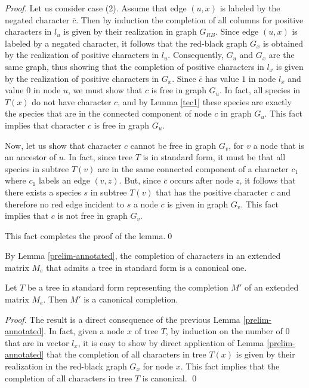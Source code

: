 \documentclass{llncs}
\begin{document}
\begin{proof}
 
 
 
 
Let us consider case (2).
Assume that edge $(u,x)$ is labeled by the negated character $\bar{c}$. Then by induction the completion of all columns for positive characters in $l_u$ is given by their realization in graph $G_{RB}$. Since edge $(u,x)$ is labeled by a negated character, it follows that the red-black graph $G_x$ is obtained by the realization of  positive characters in $l_u$.  Consequently, $G_u$ and $G_x$ are the same graph, thus showing that the completion of  positive characters in $l_x$ is   given by the realization of positive characters in $G_x$. Since $\bar{c}$ has value $1$ in node $l_x$ and value $0$ in node $u$, we must show that  $c$ is  free in graph $G_u$. In fact,  all species in $T(x)$ do not have character $c$, and by Lemma \ref{tec1} these species  are exactly the species that are  in the connected component of node $c$ in graph $G_u$. This fact implies that  character $c$ is free in graph $G_u$. 

Now, let us show that   character $c$ cannot be free   in graph $G_v$, for $v$ a node that is an ancestor of $u$. In fact, since tree $T$ is in standard form, it must be that all species in subtree $T(v)$ are in the same connected component of a character $c_1$ where $c_1$ labels an edge  $(v, z)$. But, since $\bar{c}$ occurs after node $z$, it follows that there exists a species $s$  in subtree $T(v)$ that has the positive  character $c$ and  therefore  no  red edge incident to $s$ a node $c$ is given in graph $G_v$. This fact implies that $c$ is not free in graph $G_v$.


This fact  completes  the proof of the lemma.\qed




\end{proof}



By  Lemma \ref{prelim-annotated}, the completion of characters in an extended matrix $M_e$ that admits a tree in standard form is a canonical one.

\begin{corollary}
\label{cor-annotated}
Let $T$ be a tree in standard form  representing the completion $M'$ of an extended matrix $M_e$. Then $M'$ is a canonical completion.
\end{corollary}

\begin{proof}
The result is a direct consequence of the previous Lemma \ref{prelim-annotated}. In fact, given a node $x$ of tree $T$, by induction on the number of $0$ that  are in   vector $l_x$,  it is easy to show by  direct application of Lemma \ref{prelim-annotated} that the completion of all characters in tree $T(x)$ is given by   their realization   in the red-black graph $G_x$ for node $x$. This fact implies that the completion of all characters in tree $T$ is canonical.
\qed
\end{proof}
\end{document}
